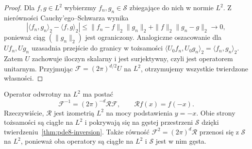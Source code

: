 \begin{proof}
Dla $f,g\in L^2$ wybierzmy $f_n,g_n\in\mathcal S$
zbiegające do nich w normie $L^2$.
Z nierówności Cauchy'ego--Schwarza wynika
\[
 |\langle f_n,g_n\rangle_2-\langle f,g\rangle_2|
 \le\|f_n-f\|_2\|g_n\|_2+\|f\|_2\|g_n-g\|_2
 \longrightarrow0,
\]
ponieważ ciąg $(\|g_n\|_2)$ jest ograniczony.
Analogiczne oszacowanie dla $Uf_n,Ug_n$
uzasadnia przejście do granicy w tożsamości
$\langle U_0f_n,U_0g_n\rangle_2
=\langle f_n,g_n\rangle_2$.
Zatem $U$ zachowuje iloczyn skalarny i jest
surjektywny, czyli jest operatorem unitarnym.
Przyjmując $\mathcal F=(2\pi)^{d/2}U$ na $L^2$,
otrzymujemy wszystkie twierdzone własności.
\end{proof}

Operator odwrotny na $L^2$ ma postać
\[
 \mathcal F^{-1}=(2\pi)^{-d}\mathcal R\mathcal F,
 \qquad \mathcal R f(x)=f(-x).
\]
Rzeczywiście, $\mathcal R$ jest izometrią $L^2$
na mocy podstawienia $y=-x$. Obie strony
tożsamości są ciągłe na $L^2$ i pokrywają się
na gęstej przestrzeni $\mathcal S$ dzięki
twierdzeniu~\ref{thm:pde8-inversion}.
Także równość $\mathcal F^2=(2\pi)^d\mathcal R$
przenosi się z $\mathcal S$ na $L^2$,
ponieważ oba operatory są ciągłe na $L^2$
i $\mathcal S$ jest w nim gęsta.

